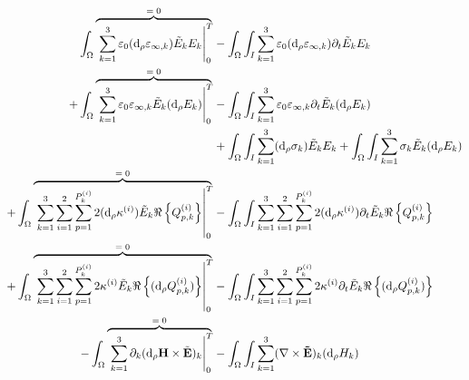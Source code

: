 \documentclass[aps,prl,notitlepage, superscriptaddress,longbibliography]{revtex4-1}
\begin{document}
\begin{equation} \label{Eq:Integr1}
\begin{split}
\int_{\Omega}\rlap{$\overbrace{\phantom{\left.\sum_{k=1}^{3}\varepsilon_{0}(\mathrm{d}_{\rho}\varepsilon_{\infty, k})\tilde{E}_k E_{k}\right|_0 ^T }}^{=\;0}$}\left.\sum_{k=1}^{3}\varepsilon_{0}(\mathrm{d}_{\rho}\varepsilon_{\infty, k})\tilde{E}_k E_{k}\right|_0 ^T 
&- \int_{\Omega}\int_{I}\sum_{k=1}^{3}\varepsilon_{0}(\mathrm{d}_{\rho}\varepsilon_{\infty, k})\partial_{t}\tilde{E}_k E_{k}\\
+\int_{\Omega}\rlap{$\overbrace{\phantom{\left.\sum_{k=1}^{3}\varepsilon_{0}\varepsilon_{\infty, k}\tilde{E}_k (\mathrm{d}_{\rho}E_{k})\right|_0 ^T}}^{=\;0}$}\left.\sum_{k=1}^{3}\varepsilon_{0}\varepsilon_{\infty, k}\tilde{E}_k (\mathrm{d}_{\rho}E_{k})\right|_0 ^T 
&- \int_{\Omega}\int_{I}\sum_{k=1}^{3}\varepsilon_{0}\varepsilon_{\infty, k}\partial_{t}\tilde{E}_k (\mathrm{d}_{\rho}E_{k})\\
&+ \int_{\Omega}\int_{I} \sum_{k=1}^{3}(\mathrm{d}_{\rho}\sigma_{k}) \tilde{E}_k E_{k}
+ \int_{\Omega}\int_{I} \sum_{k=1}^{3}\sigma_{k} \tilde{E}_k (\mathrm{d}_{\rho}E_{k})\\
+\int_{\Omega}\rlap{$\overbrace{\phantom{\left.\sum_{k=1}^{3}\sum_{i=1}^{2}\sum_{p=1}^{P_{k}^{(i)}}2(\mathrm{d}_{\rho}\kappa^{(i)})\tilde{E}_{k}\Re\left\{Q_{p, k}^{(i)}\right\}\right|_0 ^T}}^{=\;0}$}\left.\sum_{k=1}^{3}\sum_{i=1}^{2}\sum_{p=1}^{P_{k}^{(i)}}2(\mathrm{d}_{\rho}\kappa^{(i)})\tilde{E}_{k}\Re\left\{Q_{p, k}^{(i)}\right\}\right|_0 ^T 
&- \int_{\Omega}\int_{I} \sum_{k=1}^{3}\sum_{i=1}^{2}\sum_{p=1}^{P_{k}^{(i)}}2(\mathrm{d}_{\rho}\kappa^{(i)})\partial_{t}\tilde{E}_{k}\Re\left\{Q_{p, k}^{(i)}\right\}\\
+\int_{\Omega}\rlap{$\overbrace{\phantom{\left.\sum_{k=1}^{3}\sum_{i=1}^{2}\sum_{p=1}^{P_{k}^{(i)}}2\kappa^{(i)}\tilde{E}_{k}\Re\left\{(\mathrm{d}_{\rho}Q_{p, k}^{(i)})\right\}\right|_0 ^T}}^{=\;0}$}\left.\sum_{k=1}^{3}\sum_{i=1}^{2}\sum_{p=1}^{P_{k}^{(i)}}2\kappa^{(i)}\tilde{E}_{k}\Re\left\{(\mathrm{d}_{\rho}Q_{p, k}^{(i)})\right\}\right|_0 ^T 
&- \int_{\Omega}\int_{I}\sum_{k=1}^{3}  \sum_{i=1}^{2}\sum_{p=1}^{P_{k}^{(i)}}2\kappa^{(i)}\partial_{t}\tilde{E}_{k}\Re\left\{(\mathrm{d}_{\rho}Q_{p, k}^{(i)})\right\}\\
-\int_{\Omega}\rlap{$\overbrace{\phantom{\left.\sum_{k=1}^{3}\partial_{k}(\mathrm{d}_{\rho}\mathbf{H} \times \tilde{\mathbf{E}} )_{k}\right|_0 ^T}}^{=\;0}$}\left.\sum_{k=1}^{3}\partial_{k}(\mathrm{d}_{\rho}\mathbf{H} \times \tilde{\mathbf{E}} )_{k}\right|_0 ^T 
&- \int_{\Omega}\int_{I}\sum_{k=1}^{3} (\nabla \times \mathbf{\tilde{E}})_{k} (\mathrm{d}_{\rho} H_{k})\\

\end{split}
\end{equation}
\end{document}
